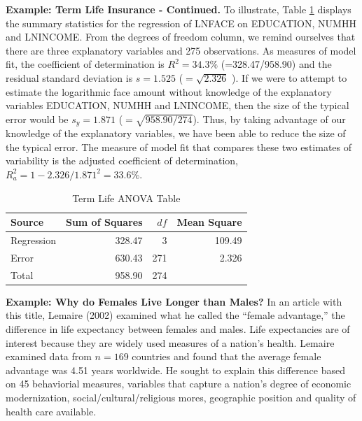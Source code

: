 \textbf{Example: Term Life Insurance - Continued.} To illustrate,
Table \ref{T3:ANOVATerm} displays the summary statistics for the
regression of LNFACE on EDUCATION, NUMHH and LNINCOME. From the
degrees of freedom column, we remind ourselves that there are three
explanatory variables and 275 observations. As measures of model
fit, the coefficient of determination is $ R^2=34.3\%$
(=328.47/958.90) and the residual standard deviation is $s=1.525$
($=\sqrt{2.326}$ ). If we were to attempt to estimate the
logarithmic face amount without knowledge of the explanatory
variables EDUCATION, NUMHH and LNINCOME, then the size of the
typical error would be $s_y=1.871$ ($=\sqrt{958.90/274}$). Thus, by
taking advantage of our knowledge of the explanatory variables, we
have been able to reduce the size of the typical error. The measure
of model fit that compares these two estimates of variability is the
adjusted coefficient of determination, $ R_a^2=1 - 2.326/1.871^2 =
33.6\%.$


\begin{table}[h]
 \caption{\label{T3:ANOVATerm} Term Life ANOVA Table}
\begin{tabular}{lrrr}
 \hline Source
& Sum of Squares & $df$ & Mean Square \\ \hline

Regression & 328.47 & 3 & 109.49 \\
Error      & 630.43 & 271 &  2.326 \\
Total & 958.90 & 274 &   \\ \hline
\end{tabular}
\linetjed {}
\end{table}



\newpage

\linejed

\textbf{Example: Why do Females Live Longer than
Males?} In an
article with this title, Lemaire (2002) examined what he called the
``female advantage,'' the difference in life expectancy between
females and males. Life expectancies are of interest because they
are widely used measures of a nation's health. Lemaire examined data
from $n=169$ countries and found that the average female advantage
was 4.51 years worldwide. He sought to explain this difference based
on 45 behaviorial measures, variables that capture a nation's degree
of economic modernization, social/cultural/religious mores,
geographic position and quality of health care available.

